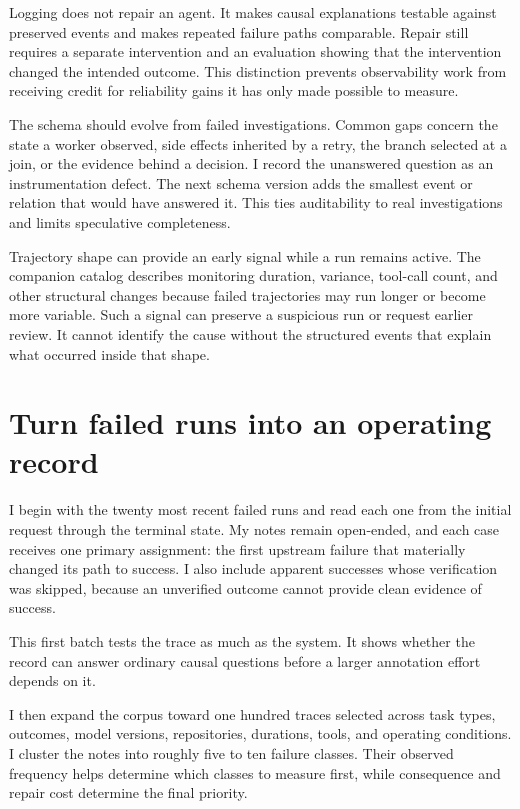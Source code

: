 Logging does not repair an agent. It makes causal explanations testable against preserved events and makes repeated failure paths comparable. Repair still requires a separate intervention and an evaluation showing that the intervention changed the intended outcome. This distinction prevents observability work from receiving credit for reliability gains it has only made possible to measure.

The schema should evolve from failed investigations. Common gaps concern the state a worker observed, side effects inherited by a retry, the branch selected at a join, or the evidence behind a decision. I record the unanswered question as an instrumentation defect. The next schema version adds the smallest event or relation that would have answered it. This ties auditability to real investigations and limits speculative completeness.

Trajectory shape can provide an early signal while a run remains active. The companion catalog describes monitoring duration, variance, tool-call count, and other structural changes because failed trajectories may run longer or become more variable. Such a signal can preserve a suspicious run or request earlier review. It cannot identify the cause without the structured events that explain what occurred inside that shape.

\hypertarget{turn-failed-runs-into-an-operating-record}{%
\section{Turn failed runs into an operating record}\label{turn-failed-runs-into-an-operating-record}}

I begin with the twenty most recent failed runs and read each one from the initial request through the terminal state. My notes remain open-ended, and each case receives one primary assignment: the first upstream failure that materially changed its path to success. I also include apparent successes whose verification was skipped, because an unverified outcome cannot provide clean evidence of success.

This first batch tests the trace as much as the system. It shows whether the record can answer ordinary causal questions before a larger annotation effort depends on it.

I then expand the corpus toward one hundred traces selected across task types, outcomes, model versions, repositories, durations, tools, and operating conditions. I cluster the notes into roughly five to ten failure classes. Their observed frequency helps determine which classes to measure first, while consequence and repair cost determine the final priority.

